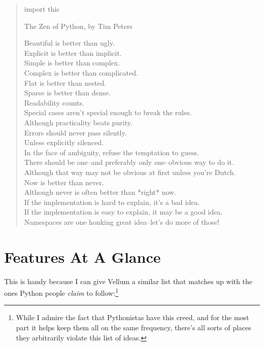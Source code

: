 \begin{verse}
import this

The Zen of Python, by Tim Peters

Beautiful is better than ugly.\\
Explicit is better than implicit.\\
Simple is better than complex.\\
Complex is better than complicated.\\
Flat is better than nested.\\
Sparse is better than dense.\\
Readability counts.\\
Special cases aren't special enough to break the rules.\\
Although practicality beats purity.\\
Errors should never pass silently.\\
Unless explicitly silenced.\\
In the face of ambiguity, refuse the temptation to guess.\\
There should be one--and preferably only one--obvious way to do it.\\
Although that way may not be obvious at first unless you're Dutch.\\
Now is better than never.\\
Although never is often better than *right* now.\\
If the implementation is hard to explain, it's a bad idea.\\
If the implementation is easy to explain, it may be a good idea.\\
Namespaces are one honking great idea--let's do more of those!
\end{verse}



\section{Features At A Glance}

This is handy because I can give Vellum a similar list that matches up with the
ones Python people \emph{claim} to follow:\footnote{While I admire the fact that
    Pythonistas have this creed, and for the most part it helps keep them all on
        the same frequency, there's all sorts of places they arbitrarily violate
        this list of ideas.}

